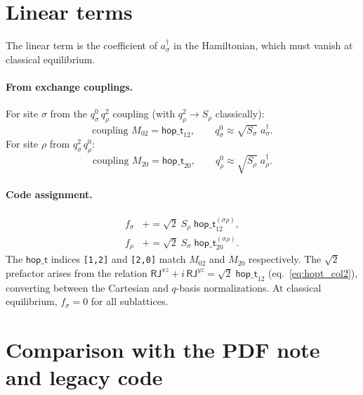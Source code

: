 \documentclass[11pt]{article}
\newcommand{\hop}{\mathsf{hop\_t}}
\newcommand{\dg}{^\dagger}
\begin{document}
\section{Linear terms}

The linear term is the coefficient of $a\dg_\sigma$ in the Hamiltonian,
which must vanish at classical equilibrium.

\paragraph{From exchange couplings.}
For site $\sigma$ from the $q^0_\sigma\,q^2_\rho$ coupling
(with $q^2_\rho \to S_\rho$ classically):
\begin{equation}
  \text{coupling } M_{02} = \hop_{12},
  \qquad
  q^0_\sigma \approx \sqrt{S_\sigma}\;a\dg_\sigma.
\end{equation}
For site $\rho$ from $q^2_\sigma\,q^0_\rho$:
\begin{equation}
  \text{coupling } M_{20} = \hop_{20},
  \qquad
  q^0_\rho \approx \sqrt{S_\rho}\;a\dg_\rho.
\end{equation}

\paragraph{Code assignment.}
\begin{align}
  f_\sigma
  &\mathrel{+}= \sqrt{2}\; S_\rho\; \hop_{12}^{(\sigma\rho)},\\
  f_\rho
  &\mathrel{+}= \sqrt{2}\; S_\sigma\; \hop_{20}^{(\sigma\rho)}.
\end{align}
The $\hop$ indices \texttt{[1,2]} and \texttt{[2,0]} match $M_{02}$
and $M_{20}$ respectively.
The $\sqrt{2}$ prefactor arises from the relation
$\mathsf{RJ}^{xz} + i\,\mathsf{RJ}^{yz} = \sqrt{2}\;\hop_{12}$
(eq.~\eqref{eq:hopt_col2}), converting between the Cartesian and
$q$-basis normalizations.
At classical equilibrium, $f_\sigma = 0$ for all sublattices.


\section{Comparison with the PDF note and legacy code}
\end{document}
